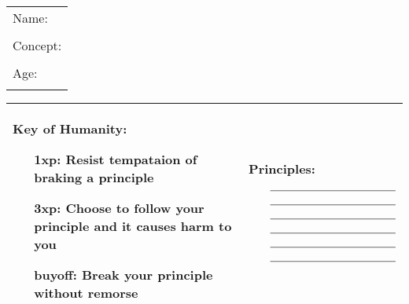 \documentclass[a4paper, 12pt, finnish]{report}
\begin{document}
\pagestyle{empty}

\begin{tabularx}{\columnwidth}{|X|} \hline
    Name:  \\  \\ \hline
    Concept: \\ \\ \hline
    Age:  \\ \\ \hline
\end{tabularx}


\begin{tabular}{|p{4cm}| p{4cm}|} \hline
\vspace{0.2cm}
    {\scriptsize
Key of Humanity:
\begin{itemize}
    \item[1xp:] Resist tempataion of braking a principle
    \item[3xp:] Choose to follow your principle and it causes harm to you
    \item[buyoff:] Break your principle without remorse
\end{itemize}} 
& 
Principles:
\begin{itemize}[leftmargin=0pt]
    \item[] $\rule{4cm}{0.15mm}$
    \item[] $\rule{4cm}{0.15mm}$
    \item[] $\rule{4cm}{0.15mm}$
    \item[] $\rule{4cm}{0.15mm}$
    \item[] $\rule{4cm}{0.15mm}$
    \item[] $\rule{4cm}{0.15mm}$
\end{itemize} \vspace{-3mm}\\ \hline
\end{tabular}
\end{document}
